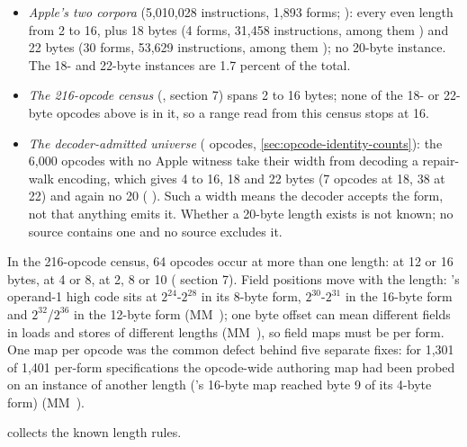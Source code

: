 \begin{itemize}
\item \emph{Apple's two corpora} (5,010,028 instructions, 1,893 forms; ): every even length
  from 2 to 16, plus 18 bytes (4 forms, 31,458 instructions, among them ) and 22 bytes (30 forms,
  53,629 instructions, among them ); no 20-byte instance. The 18- and 22-byte instances are
  1.7 percent of the total.
\item \emph{The 216-opcode census} (,  section 7) spans 2 to 16 bytes; none of
  the 18- or 22-byte opcodes above is in it, so a range read from this census stops at 16.
\item \emph{The decoder-admitted universe} ( opcodes, \cref{sec:opcode-identity-counts}): the 6,000 opcodes with no Apple witness take their width
  from decoding a repair-walk encoding, which gives 4 to 16, 18 and 22 bytes (7 opcodes at 18, 38 at 22) and again no
  20 ( ). Such a width means the decoder accepts the form, not that anything
  emits it. Whether a 20-byte length exists is not known; no source contains one and no source excludes it.
\end{itemize}

In the 216-opcode census, 64 opcodes occur at more than one length:  at 12 or 16 bytes,
 at 4 or 8,  at 2, 8 or 10
( section 7). Field positions move with the length: 's operand-1
high code sits at $2^{24}$-$2^{28}$ in its 8-byte form, $2^{30}$-$2^{31}$ in the 16-byte form and $2^{32}$/$2^{36}$ in the 12-byte form (MM~); one byte
offset can mean different fields in loads and stores of different lengths (MM~), so field maps must be per form.
One map per opcode was the common defect behind five separate fixes: for 1,301 of 1,401 per-form specifications the
opcode-wide authoring map had been probed on an instance of another length ('s 16-byte map reached
byte 9 of its 4-byte form) (MM~).

 collects the known length rules.

